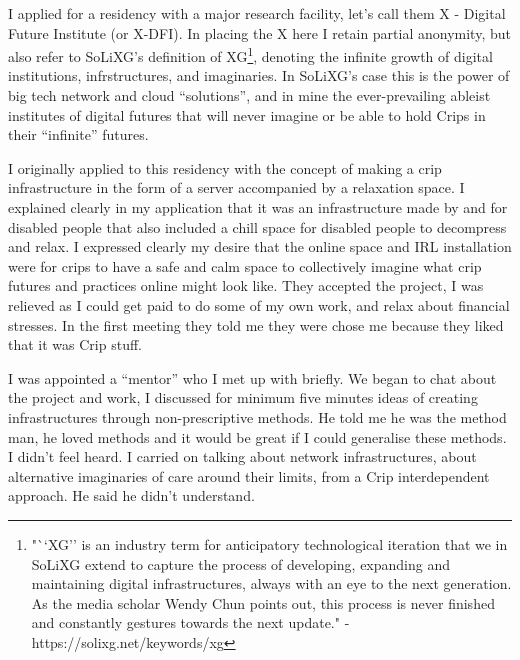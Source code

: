 I applied for a residency with a major research facility, let's call
them X - Digital Future Institute (or X-DFI). In placing the X here I
retain partial anonymity, but also refer to SoLiXG's definition of
XG\footnote{"``XG'' is an industry term for anticipatory technological
  iteration that we in SoLiXG extend to capture the process of
  developing, expanding and maintaining digital infrastructures, always
  with an eye to the next generation. As the media scholar Wendy Chun
  points out, this process is never finished and constantly gestures
  towards the next update." - https://solixg.net/keywords/xg}, denoting
the infinite growth of digital institutions, infrstructures, and
imaginaries. In SoLiXG's case this is the power of big tech network and
cloud ``solutions'', and in mine the ever-prevailing ableist institutes
of digital futures that will never imagine or be able to hold Crips in
their ``infinite'' futures.

I originally applied to this residency with the concept of making a crip
infrastructure in the form of a server accompanied by a relaxation
space. I explained clearly in my application that it was an
infrastructure made by and for disabled people that also included a
chill space for disabled people to decompress and relax. I expressed
clearly my desire that the online space and IRL installation were for
crips to have a safe and calm space to collectively imagine what crip
futures and practices online might look like. They accepted the project,
I was relieved as I could get paid to do some of my own work, and relax
about financial stresses. In the first meeting they told me they were
chose me because they liked that it was Crip stuff.

I was appointed a ``mentor'' who I met up with briefly. We began to chat
about the project and work, I discussed for minimum five minutes ideas
of creating infrastructures through non-prescriptive methods. He told me
he was the method man, he loved methods and it would be great if I could
generalise these methods. I didn't feel heard. I carried on talking
about network infrastructures, about alternative imaginaries of care
around their limits, from a Crip interdependent approach. He said he
didn't understand.

